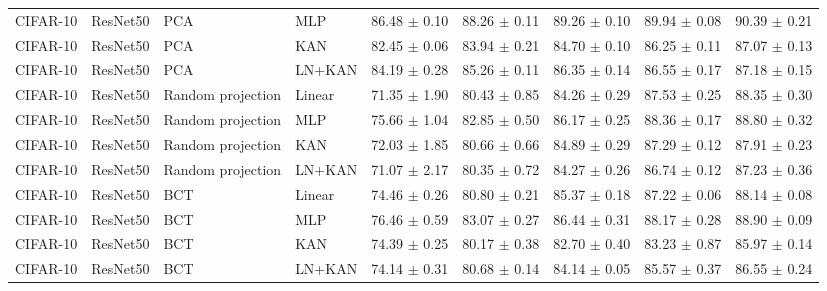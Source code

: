 \documentclass[10pt]{article}
\begin{document}
\begin{longtable}{llllccccc}
CIFAR-10 & ResNet50 & PCA & MLP & 86.48 $\pm$ 0.10 & 88.26 $\pm$ 0.11 & 89.26 $\pm$ 0.10 & 89.94 $\pm$ 0.08 & 90.39 $\pm$ 0.21 \\
CIFAR-10 & ResNet50 & PCA & KAN & 82.45 $\pm$ 0.06 & 83.94 $\pm$ 0.21 & 84.70 $\pm$ 0.10 & 86.25 $\pm$ 0.11 & 87.07 $\pm$ 0.13 \\
CIFAR-10 & ResNet50 & PCA & LN+KAN & 84.19 $\pm$ 0.28 & 85.26 $\pm$ 0.11 & 86.35 $\pm$ 0.14 & 86.55 $\pm$ 0.17 & 87.18 $\pm$ 0.15 \\
CIFAR-10 & ResNet50 & Random projection & Linear & 71.35 $\pm$ 1.90 & 80.43 $\pm$ 0.85 & 84.26 $\pm$ 0.29 & 87.53 $\pm$ 0.25 & 88.35 $\pm$ 0.30 \\
CIFAR-10 & ResNet50 & Random projection & MLP & 75.66 $\pm$ 1.04 & 82.85 $\pm$ 0.50 & 86.17 $\pm$ 0.25 & 88.36 $\pm$ 0.17 & 88.80 $\pm$ 0.32 \\
CIFAR-10 & ResNet50 & Random projection & KAN & 72.03 $\pm$ 1.85 & 80.66 $\pm$ 0.66 & 84.89 $\pm$ 0.29 & 87.29 $\pm$ 0.12 & 87.91 $\pm$ 0.23 \\
CIFAR-10 & ResNet50 & Random projection & LN+KAN & 71.07 $\pm$ 2.17 & 80.35 $\pm$ 0.72 & 84.27 $\pm$ 0.26 & 86.74 $\pm$ 0.12 & 87.23 $\pm$ 0.36 \\
CIFAR-10 & ResNet50 & BCT & Linear & 74.46 $\pm$ 0.26 & 80.80 $\pm$ 0.21 & 85.37 $\pm$ 0.18 & 87.22 $\pm$ 0.06 & 88.14 $\pm$ 0.08 \\
CIFAR-10 & ResNet50 & BCT & MLP & 76.46 $\pm$ 0.59 & 83.07 $\pm$ 0.27 & 86.44 $\pm$ 0.31 & 88.17 $\pm$ 0.28 & 88.90 $\pm$ 0.09 \\
CIFAR-10 & ResNet50 & BCT & KAN & 74.39 $\pm$ 0.25 & 80.17 $\pm$ 0.38 & 82.70 $\pm$ 0.40 & 83.23 $\pm$ 0.87 & 85.97 $\pm$ 0.14 \\
CIFAR-10 & ResNet50 & BCT & LN+KAN & 74.14 $\pm$ 0.31 & 80.68 $\pm$ 0.14 & 84.14 $\pm$ 0.05 & 85.57 $\pm$ 0.37 & 86.55 $\pm$ 0.24 \\
\end{longtable}
\normalsize
\end{document}
